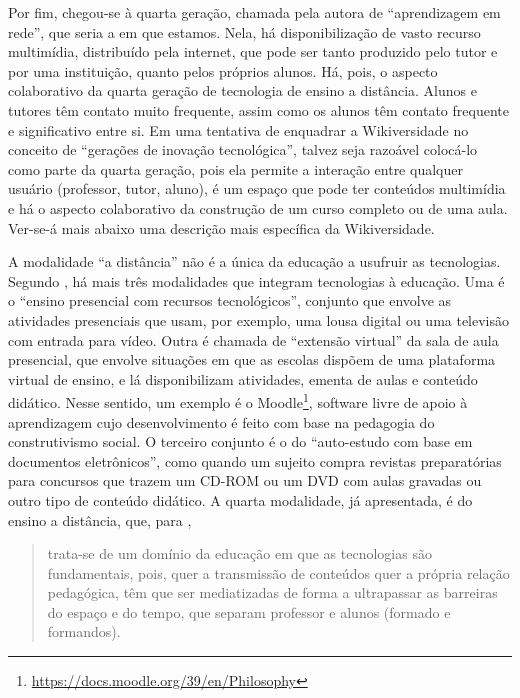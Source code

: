 \documentclass{textolivre}
\begin{document}
Por fim, chegou-se à quarta geração, chamada pela autora de “aprendizagem em rede”, que seria a em que estamos. Nela, há disponibilização de vasto recurso multimídia, distribuído pela internet, que pode ser tanto produzido pelo tutor e por uma instituição, quanto pelos próprios alunos. Há, pois, o aspecto colaborativo da quarta geração de tecnologia de ensino a distância. Alunos e tutores têm contato muito frequente, assim como os alunos têm contato frequente e significativo entre si. Em uma tentativa de enquadrar a Wikiversidade no conceito de “gerações de inovação tecnológica”, talvez seja razoável colocá-lo como parte da quarta geração, pois ela permite a interação entre qualquer usuário (professor, tutor, aluno), é um espaço que pode ter conteúdos multimídia e há o aspecto colaborativo da construção de um curso completo ou de uma aula. Ver-se-á mais abaixo uma descrição mais específica da Wikiversidade.

A modalidade “a distância” não é a única da educação a usufruir as tecnologias. Segundo \textcite{gomes2005}, há mais três modalidades que integram tecnologias à educação. Uma é o “ensino presencial com recursos tecnológicos”, conjunto que envolve as atividades presenciais que usam, por exemplo, uma lousa digital ou uma televisão com entrada para vídeo. Outra é chamada de “extensão virtual” da sala de aula presencial, que envolve situações em que as escolas dispõem de uma plataforma virtual de ensino, e lá disponibilizam atividades, ementa de aulas e conteúdo didático. Nesse sentido, um exemplo é o Moodle\footnote{\url{https://docs.moodle.org/39/en/Philosophy}}, software livre de apoio à aprendizagem cujo desenvolvimento é feito com base na pedagogia do construtivismo social. O terceiro conjunto é o do “auto-estudo com base em documentos eletrônicos”, como quando um sujeito compra revistas preparatórias para concursos que trazem um CD-ROM ou um DVD com aulas gravadas ou outro tipo de conteúdo didático. A quarta modalidade, já apresentada, é do ensino a distância, que, para \textcite[p. 233]{gomes2005},

\begin{quote}trata-se de um domínio da educação em que as tecnologias são fundamentais, pois, quer a transmissão de conteúdos quer a própria relação pedagógica, têm que ser mediatizadas de forma a ultrapassar as barreiras do espaço e do tempo, que separam professor e alunos (formado e formandos).\end{quote}
\end{document}
